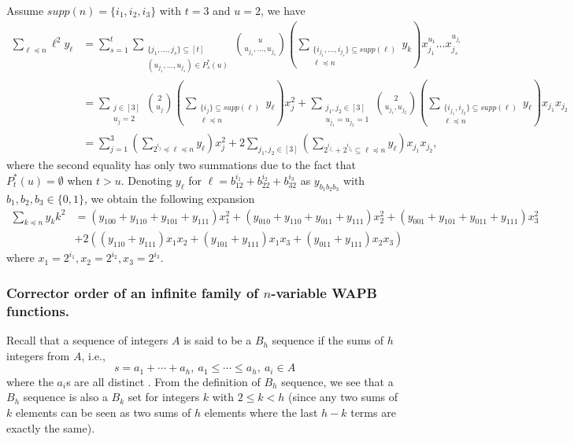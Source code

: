\documentclass[11pt]{llncs}
\begin{document}
\begin{example} \label{Ex1}
	Assume $supp(n)=\{i_1,i_2,i_3\}$ with $t= 3$ and $u=2$,
	we have
	\begin{equation*}
	\begin{aligned}
	\sum_{\ell \preceq n } \ell^2 y_\ell &= \sum_{s=1}^t\sum\limits_{\substack{\{j_1,\dots, j_s\} \subseteq [t] \\ (u_{j_1},\dots, u_{j_s})\in P^*_s(u)}} {u \choose u_{j_1},\dots, u_{j_s}} \left(  \sum_{\substack{\{i_{j_1},\dots, i_{j_s}\} \subseteq supp(\ell)   \\ \ell \preceq n }}  y_k \right)  x_{j_1}^{u_1}\dots x_{j_s}^{u_{j_s}}
	\\&=\sum\limits_{\substack{j\in [3] \\ u_j=2}} {2 \choose u_j}  \left(  \sum_{\substack{ \{i_j\} \subseteq supp(\ell)\\ \ell\preceq n}}  y_\ell \right) x_{j}^2 + \sum\limits_{\substack{{j_1,j_2}\in [3] \\ u_{j_1}=u_{j_2}=1}} {2 \choose u_{j_1},u_{j_2}}  \left(  \sum_{\substack{ \{i_{j_1},i_{j_2}\} \subseteq supp(\ell)\\ \ell\preceq n}}   y_\ell \right) x_{j_1}x_{j_2}
	\\& = \sum_{j=1}^3 \left(  \sum_{2^{i_j}\preceq \ell \preceq n}  y_\ell \right) x_{j}^2  +  2\sum\limits_{{j_1,j_2}\in [3]}  \left(  \sum_{ 2^{i_{j_1}}+2^{i_{j_2}} \subseteq \ell\preceq n}   y_\ell \right) x_{j_1}x_{j_2},
	\end{aligned}
	\end{equation*}
	where  the second equality has only two summations due to the fact that $P^*_{t}(u) = \emptyset$ when $t>u$. Denoting $y_\ell$ for $\ell = b_12^{i_1}+b_22^{i_2}+b_32^{i_3}$ as $y_{b_1b_2b_3}$ with $b_1,b_2,b_3\in \{0,1\}$,
	we obtain the following expansion
	\begin{align*}
	\sum_{k \preceq n } y_kk^2
	&= (y_{100}+y_{110}+y_{101}+y_{111}) x_1^2  + (y_{010}+y_{110}+y_{011}+y_{111}) x_2^2  + (y_{001}+y_{101}+y_{011}+y_{111}) x_3^2
	\\ & + 2 \left((y_{110}+y_{111}) x_1x_2 + (y_{101}+y_{111})x_1x_3 + (y_{011}+y_{111})x_2x_3 \right)
	\end{align*}
	where $x_1 = 2^{i_1}, x_2 = 2^{i_2}, x_3 = 2^{i_3} $.
\end{example}

\subsubsection{Corrector order of an infinite family of $n$-variable WAPB functions.}
Recall that a sequence of integers $A$ is said to be a $B_h$ sequence if the
sums of $h$ integers from $A$, i.e.,
$$
s = a_1 + \cdots + a_h, ~a_1\leq \cdots \leq a_h, ~a_i \in A
$$
where the $a_i$s are all distinct \eg \cite{cilleruelo2017}. From the definition of $B_h$ sequence,
we see that a $B_h$ sequence is also a $B_k$ set for integers $k$ with
$2 \leq k < h$ (since any two sums of $k$ elements can be seen as two sums of
$h$ elements where the last $h-k$ terms are exactly the same).
\end{document}
